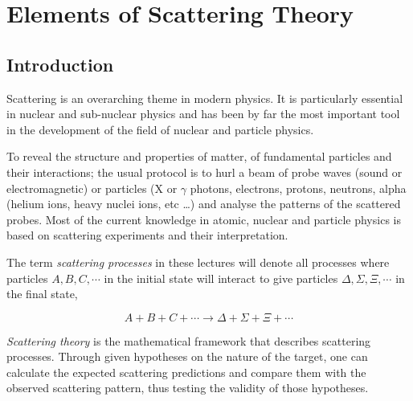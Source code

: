 %
%
%
\chapter{Elements of Scattering Theory}
\label{Scattering-1} %

\section{Introduction}

Scattering is an overarching theme in modern physics. It is particularly essential in nuclear and sub-nuclear physics and has been by far the most important tool in the development of the field of nuclear and particle physics.

To reveal the structure and properties of matter, of fundamental particles and their interactions; the usual protocol is to hurl a beam of probe waves (sound or electromagnetic) or particles (X or $\gamma$ photons, electrons, protons, neutrons, alpha (helium ions, heavy nuclei ions, etc \ldots) and analyse the patterns of the scattered probes. Most of the current knowledge in atomic, nuclear and particle physics is based on scattering experiments and their interpretation. 

The term \emph{scattering processes} in these lectures will denote all processes where particles $A,B,C, \cdots$ in the initial state will interact to give particles $\Delta, \Sigma, \Xi, \cdots$ in the final state,

$$ A+B+C+ \cdots \rightarrow \Delta + \Sigma + \Xi +\cdots$$


\emph{Scattering theory} is the mathematical framework that describes scattering processes. Through given hypotheses on the nature of the target, one can calculate the expected scattering predictions and compare them with the observed scattering pattern, thus testing the validity of those hypotheses.

